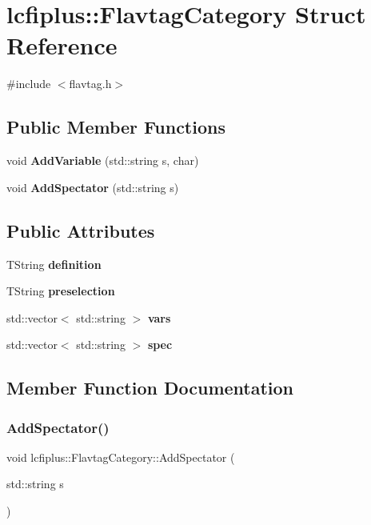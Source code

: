 \section{lcfiplus\+:\+:Flavtag\+Category Struct Reference}
\label{structlcfiplus_1_1FlavtagCategory}


{\ttfamily \#include $<$flavtag.\+h$>$}

\subsection*{Public Member Functions}
\begin{DoxyCompactItemize}
\item 
void \textbf{ Add\+Variable} (std\+::string s, char)
\item 
void \textbf{ Add\+Spectator} (std\+::string s)
\end{DoxyCompactItemize}
\subsection*{Public Attributes}
\begin{DoxyCompactItemize}
\item 
T\+String \textbf{ definition}
\item 
T\+String \textbf{ preselection}
\item 
std\+::vector$<$ std\+::string $>$ \textbf{ vars}
\item 
std\+::vector$<$ std\+::string $>$ \textbf{ spec}
\end{DoxyCompactItemize}


\subsection{Member Function Documentation}
\mbox{\label{structlcfiplus_1_1FlavtagCategory_a2fbbca0a85a4abf905d5c40ec7309db4}} 
\subsubsection{Add\+Spectator()}
{\footnotesize\ttfamily void lcfiplus\+::\+Flavtag\+Category\+::\+Add\+Spectator (\begin{DoxyParamCaption}\item[{std\+::string}]{s }\end{DoxyParamCaption})\hspace{0.3cm}{\ttfamily [inline]}}



